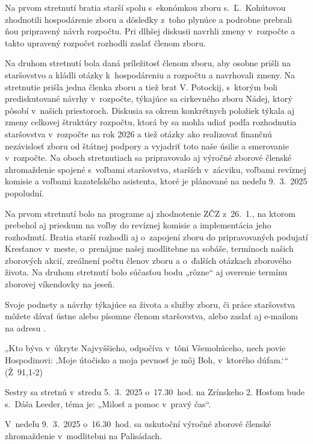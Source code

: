 Na prvom stretnutí bratia starší spolu s~ekonómkou zboru s.~Ľ.~Kohútovou zhodnotili hospodárenie zboru a dôsledky z~toho plynúce a podrobne prebrali ňou pripravený návrh rozpočtu. Pri dlhšej diskusii navrhli zmeny v~rozpočte a takto upravený rozpočet rozhodli zaslať členom zboru.

Na druhom stretnutí bola daná príležitosť členom zboru, aby osobne prišli na staršovstvo a kládli otázky k~hospodáreniu a rozpočtu a navrhovali zmeny. Na stretnutie prišla jedna členka zboru a tiež brat V. Potockij, s~ktorým boli prediskutované návrhy v~rozpočte, týkajúce sa cirkevného zboru Nádej, ktorý pôsobí v~našich priestoroch. Diskusia sa okrem konkrétnych položiek týkala aj zmeny celkovej štruktúry rozpočtu, ktorá by sa mohla udiať podľa rozhodnutia staršovstva v~rozpočte na rok 2026 a tiež otázky ako realizovať finančnú nezávislosť zboru od štátnej podpory a vyjadriť toto naše úsilie a smerovanie v~rozpočte. Na oboch stretnutiach sa pripravovalo aj výročné zborové členské zhromaždenie spojené s~voľbami staršovstva, starších v~zácviku, voľbami revíznej komisie a voľbami kazateľského asistenta, ktoré je plánované na nedeľu 9.~3.~2025 popoludní.

Na prvom stretnutí bolo na programe aj zhodnotenie ZČZ z~26.~1., na ktorom prebehol aj prieskum na voľby do revíznej komisie a implementácia jeho rozhodnutí. Bratia starší rozhodli aj o~zapojení zboru do pripravovaných podujatí Kresťanov v~meste, o~prenájme našej modlitebne na sobáše, termínoch našich zborových akcií, zreálnení počtu členov zboru a o~ďalších otázkach zborového života. Na druhom stretnutí bolo súčasťou bodu „rôzne“ aj overenie termínu zborovej víkendovky na jeseň.

Svoje podnety a návrhy týkajúce sa života a služby zboru, či práce staršovstva môžete dávať ústne alebo písomne členom staršovstva, alebo zaslať aj e-mailom na adresu .



„Kto býva v~úkryte Najvyššieho, odpočíva v~tôni Všemohúceho, nech povie Hospodinovi: ‚Moje útočisko a moja pevnosť je môj Boh, v~ktorého dúfam.‘“ (Ž~91,1-2)


Sestry sa stretnú v~stredu 5.~3.~2025 o~17.30~hod. na Zrínskeho 2. Hosťom bude s.~Dáša Leeder, téma je: „Milosť a pomoc v~pravý čas“.


V~nedeľu 9.~3.~2025 o~16.30~hod. sa uskutoční výročné zborové členské zhromaždenie v~modlitebni na Palisádach.
\vfill\break


